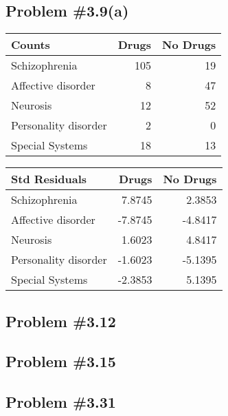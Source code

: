 \documentclass[12pt, letterpaper]{article}
\begin{document}
\subsection*{Problem {\#}3.9(a)}
	\begin{tabular}{lrr}
		\hline
		\textbf{Counts} & Drugs & No Drugs \\ 
		\hline
		Schizophrenia & 105 & 19 \\ 
		Affective disorder & 8 & 47 \\ 
		Neurosis & 12 & 52 \\ 
		Personality disorder & 2 & 0 \\ 
		Special Systems & 18 & 13 \\ 
		\hline
	\end{tabular}
\hfill 
	\begin{tabular}{lrr}
		\hline
		\textbf{Std Residuals} & Drugs & No Drugs \\ 
		\hline
		Schizophrenia & 7.8745 & 2.3853 \\ 
		Affective disorder & -7.8745 & -4.8417 \\ 
		Neurosis & 1.6023 & 4.8417 \\ 
		Personality disorder & -1.6023 & -5.1395 \\ 
		Special Systems & -2.3853 & 5.1395 \\ 
		\hline
	\end{tabular}


\subsection*{Problem {\#}3.12}
\outstanding{}
\subsection*{Problem {\#}3.15}
\outstanding{}
\subsection*{Problem {\#}3.31}
\outstanding{}
\end{document}
